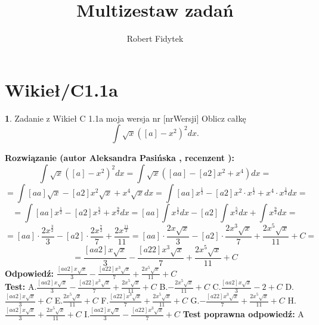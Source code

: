 \documentclass[12pt, a4paper]{article}
\title{Multizestaw zadań}
\author{Robert Fidytek}
\date{}
\theoremstyle{definition} %
\newtheorem{zad}{}
\newcommand{\kategoria}[1]{\section{#1}} %
\newcommand{\zadStart}[1]{\begin{zad}#1\newline} %
\newcommand{\zadStop}{\end{zad}}   %
\newcommand{\rozwStart}[2]{\noindent \textbf{Rozwiązanie (autor #1 , recenzent #2): }\newline} %
\newcommand{\rozwStop}{\newline}                                            %
\newcommand{\odpStart}{\noindent \textbf{Odpowiedź:}\newline}    %
\newcommand{\odpStop}{\newline}                                             %
\newcommand{\testStart}{\noindent \textbf{Test:}\newline} %
\newcommand{\testStop}{\newline} %
\newcommand{\kluczStart}{\noindent \textbf{Test poprawna odpowiedź:}\newline} %
\newcommand{\kluczStop}{\newline} %
\begin{document}
\maketitle


\kategoria{Wikieł/C1.1a}
\zadStart{Zadanie z Wikieł C 1.1a moja wersja nr [nrWersji]}
Oblicz całkę $$\int \sqrt{x}([a]-x^2)^2dx.$$
\zadStop
\rozwStart{Aleksandra Pasińska}{}
$$\int \sqrt{x}([a]-x^2)^2dx=\int \sqrt{x}([aa]-[a2]x^2+x^4)dx=$$
$$=\int[aa]\sqrt{x}-[a2]x^2\sqrt{x}+x^4\sqrt{x}dx=\int[aa]x^{\frac{1}{2}}-[a2]x^2\cdot x^{\frac{1}{2}}+x^4\cdot x^{\frac{1}{2}}dx=$$ 
$$=\int[aa]x^{\frac{1}{2}}-[a2]x^{\frac{5}{2}}+x^{\frac{9}{2}}dx=[aa]\int x^\frac{1}{2}dx-[a2]\int x^\frac{5}{2}dx+\int x^\frac{9}{2}dx=$$
$$=[aa]\cdot \frac{2x^{\frac{3}{2}}}{3}-[a2]\cdot \frac{2x^{\frac{7}{2}}}{7}+\frac{2x^{\frac{11}{2}}}{11}=[aa]\cdot \frac{2x\sqrt{x}}{3}-[a2]\cdot \frac{2x^3\sqrt{x}}{7}+\frac{2x^5\sqrt{x}}{11}+C=$$
$$= \frac{[aa2]x\sqrt{x}}{3}-\frac{[a22]x^3\sqrt{x}}{7}+\frac{2x^5\sqrt{x}}{11}+C$$
\rozwStop
\odpStart
$\frac{[aa2]x\sqrt{x}}{3}-\frac{[a22]x^3\sqrt{x}}{7}+\frac{2x^5\sqrt{x}}{11}+C$\\
\odpStop
\testStart
A.$\frac{[aa2]x\sqrt{x}}{3}-\frac{[a22]x^3\sqrt{x}}{7}+\frac{2x^5\sqrt{x}}{11}+C$
B.$-\frac{2x^5\sqrt{x}}{11}+C$
C.$\frac{[aa2]x\sqrt{x}}{3}-2+C$
D.$\frac{[aa2]x\sqrt{x}}{3}+C$
E.$\frac{2x^5\sqrt{x}}{11}+C$
F.$\frac{[a22]x^3\sqrt{x}}{7}+\frac{2x^5\sqrt{x}}{11}+C$
G.$-\frac{[a22]x^3\sqrt{x}}{7}+\frac{2x^5\sqrt{x}}{11}+C$
H.$\frac{[aa2]x\sqrt{x}}{3}+\frac{2x^5\sqrt{x}}{11}+C$
I.$\frac{[aa2]x\sqrt{x}}{3}-\frac{[a22]x^3\sqrt{x}}{7}+C$
\testStop
\kluczStart
A
\kluczStop
\end{document}
